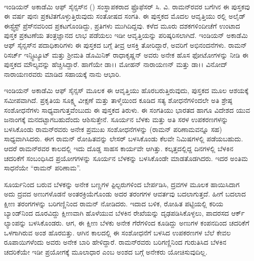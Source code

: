 

~
\thispagestyle{plain}

\vskip 1cm



\vskip 0.7cm



\noindent
ಇಂಡಿಯನ್ ಅಕಾಡೆಮಿ ಆಫ್‌ ಸೈನ್ಸಸ್‍ನ () ಸಂಸ್ಥಾಪಕರಾದ ಫ್ರೊಫೆಸರ್ ಸಿ. ವಿ. ರಾಮನ್‍ರವರ ಬಗೆಗಿನ ಈ ಪುಸ್ತಕವು ಈ ವರ್ಷ ಪುನಃ ಪ್ರಕಟಿತಗೊಳ್ಳುತ್ತಿರುವುದು ಸಂತೋಷದ ಸಂಗತಿ. ಈ ಪುಸ್ತಕದ ಮೊದಲ ಆವೃತ್ತಿಯು ರಲ್ಲಿ ಅಲೈಡ್ ಈಸ್ಟ್\enginline{-}ವೆಸ್ಟ್ ಪ್ರೆಸ್‍ನವರಿಂದ ಪ್ರಕಟಗೊಂಡಿದ್ದು, ಪ್ರತಿಗಳು ಮುಗಿದಿದ್ದವು. ಕಳೆದ ಮೂರು ದಶಕಗಳಿಂದೀಚೆಗೆ ಉಂಟಾದ ಪುಸ್ತಕ ಪ್ರಕಟಣೆಯ ತಂತ್ರಜ್ಞಾನದ ಲಾಭ ಪಡೆಯಲು ಇಡೀ ಆವೃತ್ತಿಯನ್ನು ಪರಿಷ್ಕರಿಸಲಾಗಿದೆ. ಇಂಡಿಯನ್ ಅಕಾಡೆಮಿ ಆಫ್ ಸೈನ್ಸಸ್‍ನ ಪದಾಧಿಕಾರಿಗಳು ಈ ಪುಸ್ತಕದ ಬಗ್ಗೆ ತೀವ್ರ ಆಸಕ್ತಿ ತೋರಿದ್ದಾರೆ, ಅವರಿಗೆ ಅಭಿನಂದನೆಗಳು. ರಾಮನ್ ರಿಸರ್ಚ್ ಇನ್ಸ್ಟಿಟ್ಯೂಟ್ ಮತ್ತು ಶ‍್ರೀಮತಿ ಡೊಮಿನಿಕ್ ರಾಧಾಕೃಷ್ಣನ್ ಅವರು ಅನೇಕ ಹೊಸ ಫೋಟೋಗಳನ್ನು ನೀಡಿ ಈ ಪುಸ್ತಕದ ಮೌಲ್ಯವನ್ನು ಹೆಚ್ಚಿಸಿದ್ದಾರೆ. ಹಾಗೆಯೇ ಡಾ।। ಮೋಹನ್ ನಾರಾಯಣನ್ ಮತ್ತು ಡಾ।। ವಿನೋದ್ ನಾರಾಯಣರವರು ಮಾಡಿದ ಸಹಾಯಕ್ಕೆ ನಾನು ಆಭಾರಿ.

ಇಂಡಿಯನ್ ಅಕಾಡೆಮಿ ಆಫ್‌ ಸೈನ್ಸಸ್ ಮೂಲಕ ಈ ಆವೃತ್ತಿಯು ಹೊರಬರುತ್ತಿರುವುದು, ಪುಸ್ತಕದ ಮೂಲ ಆಶಯಕ್ಕೆ ಸಮೀಪವಾಗಿದೆ. ಪ್ರಕೃತಿಯ ಸೂಕ್ಷ್ಮ ವೀಕ್ಷಣೆ ಮತ್ತು ತಾಳ್ಮೆಯಿಂದ ಕೂಡಿದ ಸತ್ಯ ಶೋಧನೆಗಳಿಂದಲೇ ಅತಿ ಶ್ರೇಷ್ಠ ಸಂಶೋಧನೆಗಳು ಸಾಧ್ಯವಾಗುತ್ತವೆಂಬುದು ಈ ಪುಸ್ತಕದ ತಿರುಳು. ಈ ಸಂಗತಿಯು ಭಾರತದ ಹಾಗೂ ವಿದೇಶದ ಯುವ ಜನಾಂಗಕ್ಕೆ ಮನದಟ್ಟಾಗಬಹುದೆಂದು ಆಶಿಸುತ್ತೇನೆ. ಸೂರ್ಯನ ಬೆಳಕು ಮತ್ತು ಅತಿ ಸರಳ ಉಪಕರಣಗಳನ್ನು ಬಳಸಿಕೊಂಡು ರಾಮನ್‍ರವರು ಅನೇಕ ಪ್ರಮುಖ ಸಂಶೋಧನೆಗಳನ್ನು (ರಾಮನ್ ಪರಿಣಾಮವನ್ನೂ ಸಹ) ಸಾಧ್ಯವಾಗಿಸಿದರು. ಈಗ ರಾಮನ್ ರೋಹಿತವನ್ನು  ಲೇಸರ್ ಬಳಸಿಕೊಂಡು ಕೆಲವೇ ನಿಮಿಷಗಳಲ್ಲಿ ಪಡೆಯಬಹುದು. ಆದರೆ ರಾಮನ್‍ರವರ ಕಾಲದಲ್ಲಿ ಇದು ದೊಡ್ಡ ಸಾಹಸ ಕಾರ್ಯವೇ ಆಗಿತ್ತು. ಕಲ್ಕತ್ತದಲ್ಲಿದ್ದ ದಿನಗಳಲ್ಲಿ ಬೆಳಕಿನ ಚದರಿಕೆಗೆ ಸಂಬಂಧಿಸಿದ ಪ್ರಯೋಗಗಳನ್ನು ಸೂರ್ಯನ ಬೆಳಕನ್ನು ಬಳಸಿಕೊಂಡೇ ಮಾಡತೊಡಗಿದರು. ಇದರ ಅಂತಿಮ ಸಾಧನೆಯೇ “ರಾಮನ್ ಪರಿಣಾಮ”.

ಸೂರ್ಯನಿಂದ ಬರುವ ಬೆಳಕನ್ನು ಅನೇಕ ಬಣ್ಣಗಳ ಫಿ಼ಲ್ಟರುಗಳಿಂದ ಬೇರ್ಪಡಿಸಿ, ದ್ರವಗಳ ಮೂಲಕ ಹಾಯಿಸಿದಾಗ ಅದು ದ್ರವದ ಅಣುಗಳೊಡನೆ ಅಂತರಕ್ರಿಯೆಗೊಂಡು ಅದರ ತರಂಗಗಳ ಆವರ್ತವು ಬದಲಾಗುತ್ತದೆ. ಹೀಗೆ ಬದಲಾದ ಕ್ಷೀಣ ತರಂಗಗಳನ್ನು ಬರಿಗಣ್ಣಿನಿಂದ ರಾಮನ್ ನೋಡಿದರು. ಇದಾದ ಬಳಿಕ, ರೋಹಿತ ಪಟ್ಟಿಯಲ್ಲಿ ಕರಿಯ ಬ್ಯಾಂಡ್‍ನಿಂದ ದೂರವಿದ್ದು ಕ್ಷೀಣವಾಗಿ ಹೊಳೆಯುವ ಬೆಳಕಿನ ರೇಖೆಯನ್ನು ದೃಢಪಡಿಸಿಕೊಳ್ಳಲು, ಪಾದರಸದ ಆರ್ಕ್ ಲ್ಯಾಂಪನ್ನು ಬಳಸಿಕೊಂಡರು. ಆಗ, ಈ ಕ್ಷೀಣ ಬೆಳಕು ಅನೇಕ ಗೆರೆಗಳಿಂದ ಕೂಡಿದ್ದು ಅಣುಗಳ ಕಂಪನದಿಂದ ಚದರಿಕೆಗೆ ಒಳಗಾಗಿರುವ ಅಂಶ ಹೊರಬಿತ್ತು. ಆಗಿನ ಕಾಲದಲ್ಲಿ ಈ ಸಂಶೋಧನೆಗೆ ಬಳಸಿದ ಉಪಕರಣಗಳ ಬೆಲೆ ಕೇವಲ  ರೂಪಾಯಿಗಳೆಂದು ಅವರು ಅನೇಕ ಬಾರಿ ಹೇಳಿದ್ದಾರೆ. ರಾಮನ್‍ರವರು ಬರಿಗಣ್ಣಿನಿಂದ ಗುರುತಿಸಿದ ಬೆಳಕಿನ ಚದರಿಕೆಯೇ ಇಡೀ ಪ್ರಯೋಗಕ್ಕೆ ಮೂಲಾಧಾರ ಎಂಬ ಅಂಶದ ಬಗ್ಗೆ ಅನೇಕರು ಯೋಚಿಸುವುದಿಲ್ಲ.

